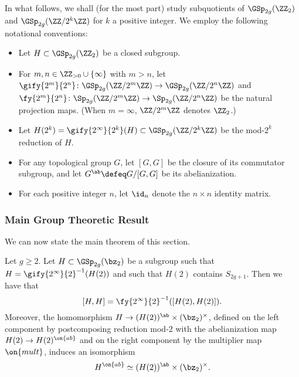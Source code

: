 In what follows, we shall (for the most part) study subquotients of $\GSp_{2g}(\ZZ_2)$ and $\GSp_{2g}(\ZZ/ 2^k \ZZ)$ for $k$ a positive integer. We employ the following notational conventions:
\begin{itemize}
\item Let $H\subset \GSp_{2g}(\ZZ_2)$ be a closed subgroup.
\item For $m, n \in \ZZ_{> 0} \cup \{\infty\}$ 
	with $m > n$, let $\gify{2^m}{2^n} \colon \GSp_{2g}(\ZZ/2^m \ZZ) \to \GSp_{2g}(\ZZ/2^n \ZZ)$ and $\fy{2^m}{2^n} \colon \Sp_{2g}(\ZZ/2^m \ZZ) \to \Sp_{2g}(\ZZ/2^n \ZZ)$ be the natural projection maps. (When $m = \infty$, $\ZZ/2^m\ZZ$ denotes $\ZZ_2$.) 
\item Let $H(2^k) = \gify{2^\infty}{2^k}(H) \subset \GSp_{2g}(\ZZ/2^k \ZZ)$ be the mod-$2^k$ reduction of $H$.
\item For any topological group $G$, let $[G,G]$ be the closure of its commutator subgroup, and let $G^{\ab} \defeq G/{ {[G,G]}}$ be its abelianization.
\item For each positive integer $n$, let $\id_n$ denote the $n \times n$ identity matrix.
\end{itemize}

\subsubsection{Main Group Theoretic Result}

We can now state the main theorem of this section.

\begin{theorem} \label{theorem:small-ab}
	Let $g \geq 2$. Let $H \subset \GSp_{2g}(\bz_2)$ be a subgroup such that $H = \gify{2^\infty}{2}^{-1}(H(2))$    and such that $H(2)$ contains $S_{2g+1}$. 
    Then we have that
	\begin{equation}\label{thefirstclaim}
    [H, H] = \fy{2^\infty}{2}^{-1}([H(2), H(2)]).
    \end{equation}
	Moreover, the homomorphism \(H \to (H(2))^{\ab} \times (\bz_2)^\times\), defined on the left component by postcomposing reduction mod-2 with the abelianization map $H(2) \to H(2)^{\on{ab}}$ and on the right component by the multiplier map $\on{mult}$, induces an isomorphism
    \begin{equation}\label{thesecondclaim}
    H^{\on{ab}} \simeq (H(2))^{\ab} \times (\bz_2)^\times.
    \end{equation}
\end{theorem}

